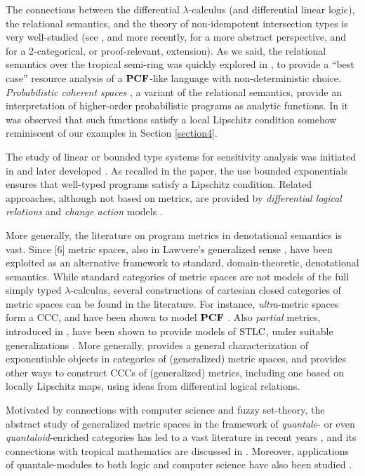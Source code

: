 
The connections between the differential $\lambda$-calculus (and differential linear logic), the relational semantics, and the theory of non-idempotent intersection types is very well-studied (see \cite{}, and more recently, \cite{} for a more abstract perspective, and \cite{} for a 2-categorical, or proof-relevant, extension).
As we said, the relational semantics over the tropical semi-ring was quickly explored in \cite{}, to provide a ``best case'' resource analysis of a $\mathbf{PCF}$-like language with non-deterministic choice. 
\emph{Probabilistic coherent spaces} \cite{}, a variant of  the relational semantics, provide an interpretation of higher-order probabilistic programs
as analytic functions. In \cite{} it was observed that such functions satisfy a local Lipschitz condition somehow reminiscent of our examples in Section \ref{section4}.


The study of linear or bounded type systems for sensitivity analysis was initiated in \cite{} and later developed \cite{}.
As recalled in the paper, the use bounded exponentials ensures that well-typed programs satisfy a Lipschitz condition.
Related approaches, although not based on metrics, are provided by \emph{differential logical relations} \cite{} and \emph{change action} models \cite{}.


More generally, the literature on program metrics in denotational semantics is vast. Since [6] metric spaces, also in Lawvere's generalized sense \cite{}, have been exploited as an alternative framework to standard, domain-theoretic, denotational semantics. 
While standard categories of metric spaces are not models of the full simply typed $\lambda$-calculus, several constructions of cartesian closed categories of metric spaces can be found in the literature. For instance, 
\emph{ultra}-metric spaces \cite{} form a CCC, and have been shown to model $\mathbf{PCF}$ \cite{}.
Also \emph{partial} metrics, introduced in \cite{}, have been shown to provide models of $\mathrm{STLC}$, under suitable generalizations \cite{}.
More generally, \cite{} provides a general characterization of exponentiable objects in categories of (generalized) metric spaces, and \cite{} provides other ways to construct CCCs of
(generalized) metrics, including one based on locally Lipschitz maps, 
using ideas from {differential logical relations}.

Motivated by connections with computer science and fuzzy set-theory, 
the abstract study of generalized metric spaces in the framework of \emph{quantale}- or even \emph{quantaloid}-enriched categories has led to a vast literature in recent years \cite{}, 
and its connections with tropical mathematics are discussed in \cite{}. Moreover, applications of quantale-modules to both logic and computer science have also been studied \cite{}.

